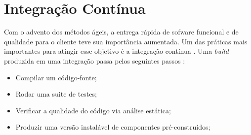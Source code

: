 \section{Integração Contínua}

Com o advento dos métodos ágeis, a entrega rápida de sofware funcional e de qualidade para o cliente teve sua importância aumentada. Um das práticas mais importantes para atingir esse objetivo é a integração contínua \cite{continuous-integration}. Uma \textit{build} produzida em uma integração passa pelos seguintes passos \cite{continuous-integration}:
\begin{itemize}
\item Compilar um código-fonte;
\item Rodar uma suite de testes; 
\item Verificar a qualidade do código via análise estática;
\item Produzir uma versão instalável de componentes pré-construídos; 
\end{itemize}
